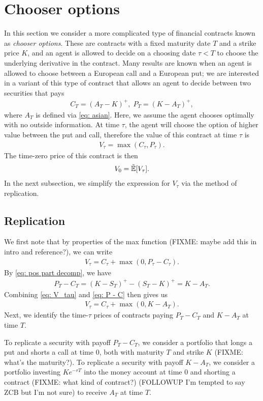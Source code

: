 \documentclass[reqno]{amsart}
\begin{document}
\section{Chooser options}
In this section we consider a more complicated type of financial contracts known as \emph{chooser options}. These are contracts with a fixed maturity date $T$ and a strike price $K$, and an agent is allowed to decide on a choosing date $\tau < T$ to choose the underlying derivative in the contract. Many results are known when an agent is allowed to choose between a European call and a European put; we are interested in a variant of this type of contract that allows an agent to decide between two securities that pays 
\begin{align}
     C_T = (A_T - K)^+, \; P_T = (K - A_T)^+,
\end{align}
where $A_T$ is defined via \eqref{eq: asian}.
Here, we assume the agent chooses optimally with no outside information. At time $\tau$, the agent will choose the option of higher value between the put and call, therefore the value of this contract at time $\tau$ is 
\begin{align}\label{eq: V_tau}
     V_\tau = \max(C_\tau, P_\tau).
\end{align}
The time-zero price of this contract is then 
\begin{align}
      V_0 = \tilde{\mathbb{E}}[V_\tau].
\end{align}
In the next subsection, we simplify the expression for $V_\tau$ via the method of replication. 
\subsection{Replication}
We first note that by properties of the max function (FIXME: maybe add this in intro and reference?), we can write 
\begin{align}
     V_\tau = C_\tau + \max(0, P_\tau - C_\tau).
\end{align}
By \eqref{eq: pos part decomp}, we have
\begin{align}\label{eq: P - C}
     P_T - C_T = (K-S_T)^+ - (S_T - K)^+ = K - A_T. 
\end{align}
Combining \eqref{eq: V_tau} and \eqref{eq: P - C} then gives us 
\begin{align}
      V_\tau = C_\tau + \max(0, K - A_T).
\end{align}
Next, we identify the time-$\tau$ prices of contracts paying $P_T - C_T$ and $K - A_T$ at time $T$.

To replicate a security with payoff $P_T - C_T$, we consider a portfolio that longs a put and shorts a call at time $0$, both with maturity $T$ and strike $K$ (FIXME: what's the maturity?). To replicate a security with payoff $K - A_T$,  we consider a portfolio investing $Ke^{-rT}$ into the money account at time 0 and shorting a contract (FIXME: what kind of contract?) (FOLLOWUP I'm tempted to say ZCB but I'm not sure) to receive $A_T$ at time $T$. 
\end{document}
